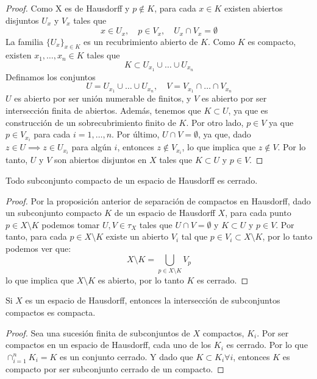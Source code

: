 \begin{proof}
    Como X es de Hausdorff y $p \notin K$, para cada $x \in K$ existen abiertos disjuntos $U_x$ y $V_x$ tales que 
    $$x \in U_x,\quad p \in V_x, \quad U_x \cap V_x = \emptyset$$
    La familia $\{U_x\}_{x \in K}$ es un recubrimiento abierto de $K$. Como $K$ es compacto, existen $x_1, \ldots, x_n \in K$ tales que
    $$K \subset U_{x_1} \cup \ldots \cup U_{x_n}$$
    Definamos los conjuntos
    $$U = U_{x_1} \cup \ldots \cup U_{x_n}, \quad V = V_{x_1} \cap \ldots \cap V_{x_n}$$
    $U$ es abierto por ser unión numerable de finitos, y $V$ es abierto por ser intersección finita de abiertos. 
    Además, tenemos que $K \subset U$, ya que es construcción de un sobrecubrimiento finito de $K$. Por otro lado, $p \in V$ ya que $p \in V_{x_i}$ para cada $i = 1, \ldots, n$. Por último, $U \cap V = \emptyset$, ya que, dado $z \in U \implies z \in U_{x_i}$ para algún $i$, entonces $z \notin V_{x_i}$, lo que implica que $z \notin V$. Por lo tanto, $U$ y $V$ son abiertos disjuntos en $X$ tales que $K \subset U$ y $p \in V$.
\end{proof}
\begin{corolario}
    Todo subconjunto compacto de un espacio de Hausdorff es cerrado.
\end{corolario}
\begin{proof}
    Por la proposición anterior de separación de compactos en Hausdorff, dado un subconjunto compacto $K$ de un espacio de Hausdorff $X$, para cada punto $p \in X \setminus K$ podemos tomar $U, V \in \tau_X$ tales que $U \cap V = \emptyset$ y $K \subset U$ y $p \in V$. Por tanto, para cada $p \in X \setminus K$ existe un abierto $V_i$ tal que $p \in V_i \subset X \setminus K$, por lo tanto podemos ver que: 
    $$X \setminus K = \bigcup_{p \in X \setminus K} V_p$$
    lo que implica que $X \setminus K$ es abierto, por lo tanto $K$ es cerrado.
\end{proof}
\begin{proposición}
    Si $X$ es un espacio de Hausdorff, entonces la intersección de subconjuntos compactos es compacta.
\end{proposición}
\begin{proof}
    Sea una sucesión finita de subconjuntos de $X$ compactos, $K_i$. Por ser compactos en un espacio de Hausdorff, cada uno de los $K_i$ es cerrado. Por lo que $\cap_{i = 1}^{n} K_i = K$ es un conjunto cerrado. Y dado que $K \subset K_i \forall i$, entonces $K$ es compacto por ser subconjunto cerrado de un compacto.
\end{proof}
